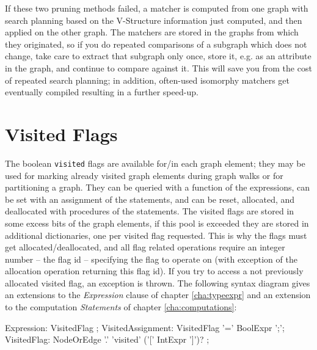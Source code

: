 If these two pruning methods failed, a matcher is computed from one graph with search planning based on the V-Structure information just computed, and then applied on the other graph.
The matchers are stored in the graphs from which they originated, so if you do repeated comparisons of a subgraph which does not change, take care to extract that subgraph only once, store it, e.g. as an attribute in the graph, and continue to compare against it. 
This will save you from the cost of repeated search planning; in addition, often-used isomorphy matchers get eventually compiled resulting in a further speed-up.


\section{Visited Flags} \label{sub:visitedaccess}

The boolean \texttt{visited} flags are available for/in each graph element; 
they may be used for marking already visited graph elements during graph walks or for partitioning a graph.
They can be queried with a function of the expressions, can be set with an assignment of the statements, and can be reset, allocated, and deallocated with procedures of the statements.
The visited flags are stored in some excess bits of the graph elements, if this pool is exceeded they are stored in additional dictionaries, one per visited flag requested.
This is why the flags must get allocated/deallocated, and all flag related operations require an integer number -- the flag id -- specifying the flag to operate on (with exception of the allocation operation returning this flag id).
If you try to access a not previously allocated visited flag, an exception is thrown.
The following syntax diagram gives an extensions to the \emph{Expression} clause of chapter \ref{cha:typeexpr} and an extension to the computation \emph{Statements} of chapter \ref{cha:computations}:

\begin{rail}
	Expression: VisitedFlag ;
  VisitedAssignment: VisitedFlag '=' BoolExpr ';';
	VisitedFlag: NodeOrEdge '.' 'visited' ('[' IntExpr ']')? ;
\end{rail}

